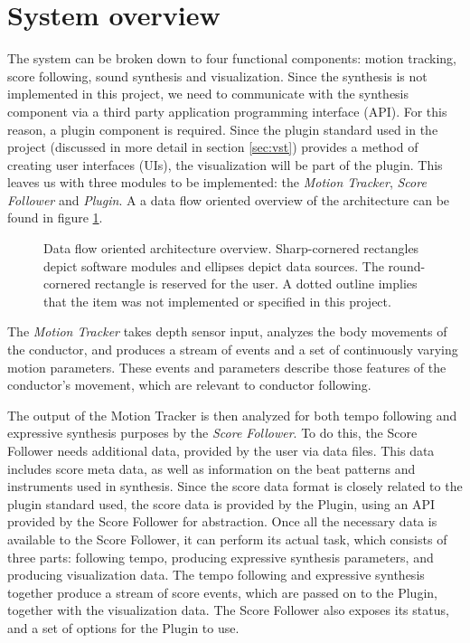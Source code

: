 \section{System overview}

The system can be broken down to four functional components:
motion tracking, score following, sound synthesis
and visualization.
Since the synthesis is not implemented in this project,
we need to communicate with the synthesis component
via a third party application programming interface (API).
For this reason, a plugin component is required.
Since the plugin standard used in the project
(discussed in more detail in section \ref{sec:vst})
provides a method of creating user interfaces (UIs),
the visualization will be part of the plugin.
This leaves us with three modules
to be implemented:
the \textit{Motion Tracker}, \textit{Score Follower} and \textit{Plugin}.
A a data flow oriented overview of the architecture
can be found in figure \ref{fig:architecture}.

\begin{figure}
\begin{center}

\caption{
Data flow oriented architecture overview.
Sharp-cornered rectangles depict software modules and
ellipses depict data sources.
The round-cornered rectangle is reserved for the user.
A dotted outline implies that the item was not
implemented or specified in this project.
}
\label{fig:architecture}
\end{center}
\end{figure}

The \textit{Motion Tracker}
takes depth sensor input,
analyzes the body movements of the conductor,
and produces a stream of events and
a set of continuously varying motion parameters.
These events and parameters describe
those features of the conductor's movement,
which are relevant to conductor following.

The output of the Motion Tracker is then analyzed
for both tempo following and expressive synthesis purposes
by the \textit{Score Follower}.
To do this, the Score Follower needs additional
data, provided by the user via data files.
This data includes
score meta data, as well as
information on the beat patterns and instruments used in synthesis.
Since the score data format is closely related to the
plugin standard used,
the score data is provided by the Plugin,
using an API provided by the Score Follower for abstraction.
Once all the necessary data is available to the Score Follower,
it can perform its actual task,
which consists of three parts:
following tempo,
producing expressive synthesis parameters, and
producing visualization data.
The tempo following and expressive synthesis together
produce a stream of score events,
which are passed on to the Plugin,
together with the visualization data.
The Score Follower also exposes its status,
and a set of options for the Plugin to use.

